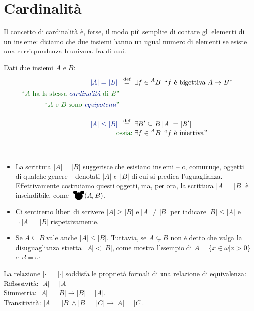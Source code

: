 \section{Cardinalit\`a}
Il concetto di cardinalit\`a \`e, forse, il modo pi\`u semplice di contare gli elementi di un insieme: diciamo che due insiemi hanno un ugual numero di elementi se esiste
una corrispondenza biunivoca fra di essi.

\begin{definition}
	Dati due insiemi $A$ e $B$:
\begin{align*}
{\drkblu |A| = |B|} \;\;\Mydef\;\;& \exists {f \in {}^A B} \;\; \text{``$f$ \`e bigettiva $A \to B$''}\\[-\jot]
\text{\drkgrn ``$A$ ha la stessa \vocab{cardinalit\`a} di $B$''}\phantom{\;\;\Mydef\;\;}&\\[-\jot]
\text{\drkgrn ``$A$ e $B$ sono \vocab{equipotenti}''}\phantom{\;\;\Mydef\;\;}&\\[-\jot]
\\[-\jot]
{\drkblu |A| \leq |B|} \;\;\Mydef\;\;& \exists {B' \subseteq B} \; |A| = |B'|\\[-\jot]
\text{\drkgrn ossia:}\;&\exists {f \in {}^A B} \;\;\text{``$f$ \`e iniettiva''}
\end{align*}
\end{definition}

\begin{note}
\ 
\baselineskip
\ 
	\begin{itemize}
		\item La scrittura $|A| = |B|$ suggerisce che esistano insiemi -- o, comunuqe, oggetti di qualche genere -- denotati $|A|$ e~$|B|$ di cui si predica l'uguaglianza.
		Effettivamente costruiamo questi oggetti, ma, per ora, la
scrittura $|A| = |B|$ \`e inscindibile, come $\mouse(A,B)$.
		\item Ci sentiremo liberi di scrivere
$|A|\ge|B|$ e $|A|\neq|B|$ per indicare $|B|\le|A|$ e~$\neg\,|A|=|B|$
rispettivamente.
		\item Se $A\subseteq B$ vale anche $|A|\le|B|$. Tuttavia,
se $A \subsetneq B$ non \`e detto che valga la
disuguaglianza stretta~$|A|<|B|$, come mostra l'esempio di $A = \{x \in \omega | x > 0\}$ e $B = \omega$.
	\end{itemize}
\end{note}

\begin{remark}
	La relazione $|\cdot| = |\cdot|$ soddisfa le propriet\`a formali
di una relazione di equivalenza:\\
{\drkblu Riflessivit\`a:} $|A| = |A|$.\\
{\drkblu Simmetria:} $|A| = |B| \rightarrow |B| = |A|$.\\
{\drkblu Transitivit\`a:} $|A| = |B| \land |B| = |C| \rightarrow |A| = |C|$.
\end{remark}

